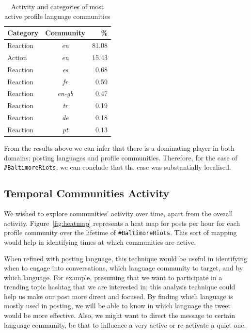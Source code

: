 \documentclass[conference]{IEEEtran}
\begin{document}
\begin{table}[!htb]
\centering
\begin{tabular}{@{}lcr@{}}
\toprule
\textbf{Category} & \textbf{Community} & \textbf{\%} \\ \midrule
Reaction & {\emph{en}} & 81.08 \\
Action & {\emph{en}} & 15.43 \\
Reaction & {\emph{es}} & 0.68 \\
Reaction & {\emph{fr}} & 0.59 \\
Reaction & {\emph{en-gb}} & 0.47 \\
Reaction & {\emph{tr}} & 0.19 \\
Reaction & {\emph{de}} & 0.18 \\
Reaction & {\emph{pt}} & 0.13 \\ \bottomrule
\end{tabular}
\caption{Activity and categories of most active profile language
  communities}
\label{tbl:mostactive}
\end{table}

From the results above we can infer that there is a dominating player
in both domains: posting languages and profile communities. Therefore,
for the case of {\texttt{\#BaltimoreRiots}}, we can conclude that the case was
substantially localised.


\subsection{Temporal Communities Activity}

We wished to explore communities' activity over time, apart from the
overall activity. Figure~\ref{fig:heatmap} represents a heat map for
posts per hour for each profile community over the lifetime of
{\texttt{\#BaltimoreRiots}}. This sort of mapping would help in
identifying times at which communities are active.

When refined with posting language, this technique would be useful in
identifying when to engage into conversations, which language
community to target, and by which language. For example, presuming
that we want to participate in a trending topic hashtag that we are
interested in; this analysis technique could help us make our post
more direct and focused. By finding which language is mostly used in
posting, we will be able to know in which language the tweet would be
more effective. Also, we might want to direct the message to certain
language community, be that to influence a very active or re-activate
a quiet one.
\end{document}
